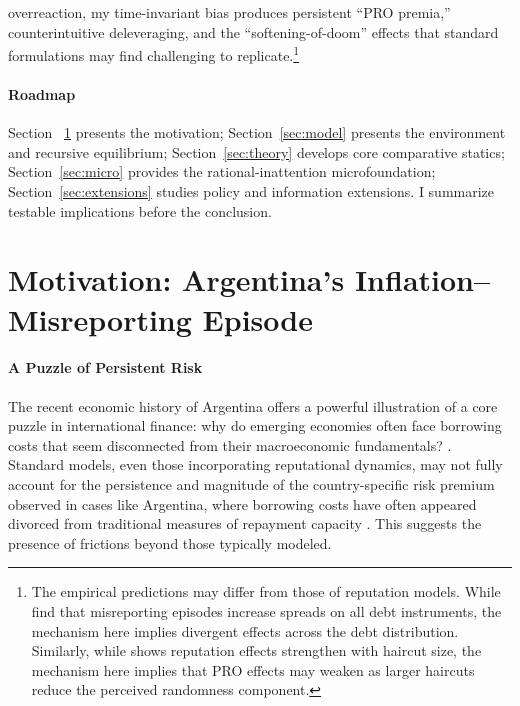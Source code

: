 \documentclass[12pt]{article}
\theoremstyle{plain}
\begin{document}
overreaction, my time-invariant bias produces persistent ``PRO premia,''
counterintuitive deleveraging, and the ``softening-of-doom'' effects that
standard formulations may find challenging to replicate.\footnote{The empirical
	predictions may differ from those of reputation models. While
	\citet{MorelliMoretti2023} find that misreporting episodes increase spreads on
	all debt instruments, the mechanism here implies divergent effects across the
	debt distribution. Similarly, while \citet{AmadorPhelan2023} shows reputation
	effects strengthen with haircut size, the mechanism here implies that PRO
	effects may weaken as larger haircuts reduce the perceived randomness
	component.}

\paragraph{Roadmap} Section ~\ref{sec:motivation} presents the motivation;
Section~\ref{sec:model} presents the environment and recursive equilibrium;
Section~\ref{sec:theory} develops core comparative statics;
Section~\ref{sec:micro} provides the rational‑inattention microfoundation;
Section~\ref{sec:extensions} studies policy and information extensions. I
summarize testable implications before the conclusion.
\section{Motivation: Argentina's Inflation--Misreporting Episode}
\label{sec:motivation}

\paragraph{A Puzzle of Persistent Risk}
The recent economic history of Argentina offers a powerful illustration of a
core puzzle in international finance: why do emerging economies often face
borrowing costs that seem disconnected from their macroeconomic fundamentals?
\citet{TomzWright2013, MeyerReinhartTrebesch2022}. Standard models, even those
incorporating reputational dynamics, may not fully account for the persistence
and magnitude of the country-specific risk premium observed in cases like
Argentina, where borrowing costs have often appeared divorced from traditional
measures of repayment capacity \citet{MorelliMoretti2023}. This suggests the
presence of frictions beyond those typically modeled.
\end{document}

